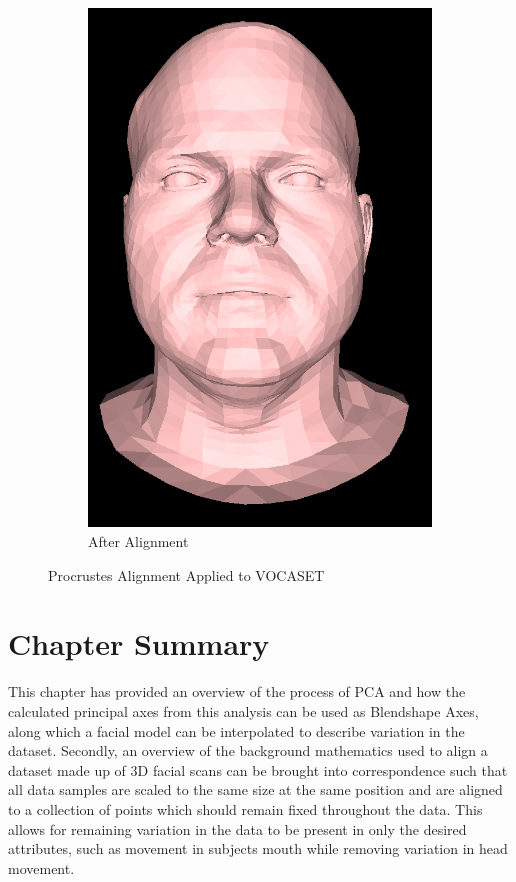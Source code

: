\begin{figure}[h]
\begin{subfigure}[b]{0.4\textwidth}
        \includegraphics[width=\textwidth]{figures/dataset/subject2_aligned.png}
        \caption{After Alignment}
    \end{subfigure}
    \caption{Procrustes Alignment Applied to VOCASET \cite{Cudeiro2019}}\label{fig:VOCASET_Alignment}
\end{figure}

\section{Chapter Summary}
This chapter has provided an overview of the process of PCA and how the calculated principal axes from this analysis can be used as Blendshape Axes, along which a facial model can be interpolated to describe variation in the dataset.
Secondly, an overview of the background mathematics used to align a dataset made up of 3D facial scans can be brought into correspondence such that all data samples are scaled to the same size at the same position and are aligned to a collection of points which should remain fixed throughout the data.
This allows for remaining variation in the data to be present in only the desired attributes, such as movement in subjects mouth while removing variation in head movement.